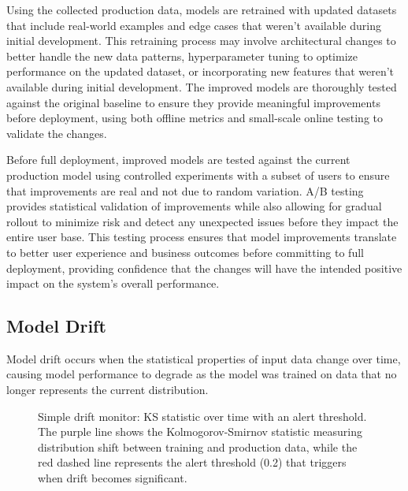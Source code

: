 Using the collected production data, models are retrained with updated datasets that include real-world examples and edge cases that weren't available during initial development. This retraining process may involve architectural changes to better handle the new data patterns, hyperparameter tuning to optimize performance on the updated dataset, or incorporating new features that weren't available during initial development. The improved models are thoroughly tested against the original baseline to ensure they provide meaningful improvements before deployment, using both offline metrics and small-scale online testing to validate the changes.

Before full deployment, improved models are tested against the current production model using controlled experiments with a subset of users to ensure that improvements are real and not due to random variation. A/B testing provides statistical validation of improvements while also allowing for gradual rollout to minimize risk and detect any unexpected issues before they impact the entire user base. This testing process ensures that model improvements translate to better user experience and business outcomes before committing to full deployment, providing confidence that the changes will have the intended positive impact on the system's overall performance.


\subsection{Model Drift}
Model drift occurs when the statistical properties of input data change over time, causing model performance to degrade as the model was trained on data that no longer represents the current distribution.

\begin{figure}[h]
  \centering
  \caption{Simple drift monitor: KS statistic over time with an alert threshold. The purple line shows the Kolmogorov-Smirnov statistic measuring distribution shift between training and production data, while the red dashed line represents the alert threshold (0.2) that triggers when drift becomes significant.}
  \label{fig:drift-monitor}
\end{figure}

